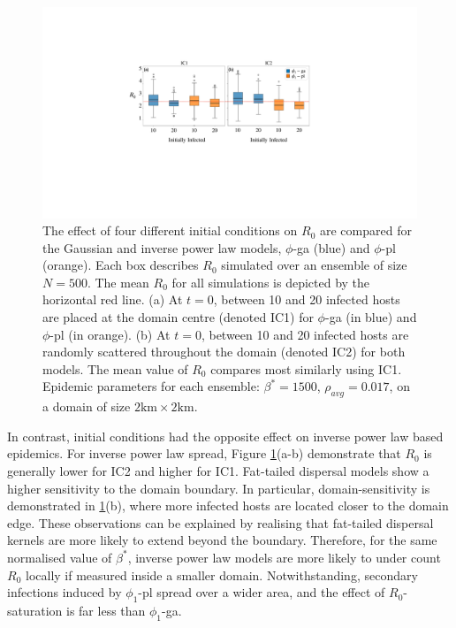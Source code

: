 \begin{figure}
    \centering
    \includegraphics[scale=0.475]{chapter6/figures/fig5-IC.pdf}
    \caption{
    The effect of four different initial conditions on $R_0$ are compared for the Gaussian and inverse power law models, $\phi$-ga (blue) and $\phi$-pl (orange).
    Each box describes $R_0$ simulated over an ensemble of size $N=500$. 
    The mean $R_0$ for all simulations is depicted by the horizontal red line. 
    (a) At $t=0$, between 10 and 20 infected hosts are placed at the domain centre (denoted IC1) for $\phi$-ga (in blue) and $\phi$-pl (in orange).
    (b) At $t=0$, between 10 and 20 infected hosts are randomly scattered throughout the domain (denoted IC2) for both models. The mean value of $R_0$ compares most similarly using IC1.
    Epidemic parameters for each ensemble: $\beta^*=1500$, $\rho_{avg}=0.017$, on a domain of size $\mathrm{2km\times 2km}$. 
  }
    \label{fig:seir-ash-IC}
\end{figure}

In contrast, initial conditions had the opposite effect on inverse power law based epidemics.
For inverse power law spread, Figure \ref{fig:seir-ash-IC}(a-b) demonstrate that $R_0$ is generally lower for IC2 and higher for IC1. Fat-tailed dispersal models show a higher sensitivity to the domain boundary.
In particular, domain-sensitivity is demonstrated in \ref{fig:seir-ash-IC}(b), where more infected hosts are located closer to the domain edge.
These observations can be explained by realising that fat-tailed dispersal kernels are more likely to extend beyond the boundary. Therefore, for the same normalised value of $\beta^*$, inverse power law models are more likely to under count $R_0$ locally if measured inside a smaller domain. Notwithstanding, secondary infections induced by $\phi_1$-pl spread over a wider area, and the effect of $R_0$-saturation is far less than $\phi_1$-ga.

